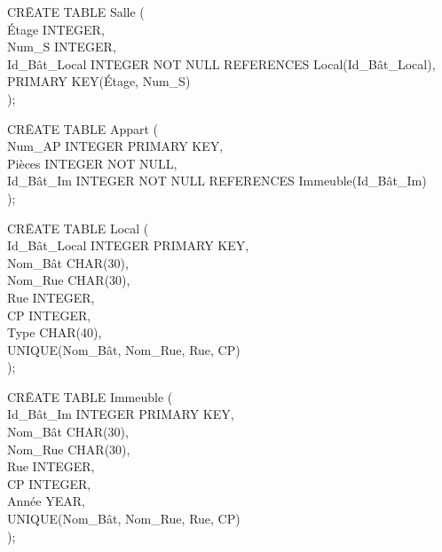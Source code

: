 \documentclass[a4paper,10.5pt]{report}
\begin{document}
		\begin{tabbing}
			CR\=EATE TABLE Salle (\\
			\> Étage INTEGER,\\
			\> Num\_S INTEGER,\\
			\> Id\_Bât\_Local INTEGER NOT NULL REFERENCES Local(Id\_Bât\_Local),\\
			\> PRIMARY KEY(Étage, Num\_S)\\);
		\end{tabbing}

		\begin{tabbing}
			CR\=EATE TABLE Appart (\\
			\> Num\_AP INTEGER PRIMARY KEY,\\
			\> Pièces INTEGER NOT NULL,\\
			\> Id\_Bât\_Im INTEGER NOT NULL REFERENCES Immeuble(Id\_Bât\_Im)\\);
		\end{tabbing}
                                                   
		\begin{tabbing}
			CR\=EATE TABLE Local (\\
			\> Id\_Bât\_Local INTEGER PRIMARY KEY,\\
			\> Nom\_Bât CHAR(30),\\
			\> Nom\_Rue CHAR(30),\\
			\> Rue INTEGER,\\
			\> CP INTEGER,\\
			\> Type CHAR(40),\\
			\> UNIQUE(Nom\_Bât, Nom\_Rue, Rue, CP)\\);
		\end{tabbing}
		\begin{tabbing}
			CR\=EATE TABLE Immeuble (\\
			\> Id\_Bât\_Im INTEGER PRIMARY KEY,\\
			\> Nom\_Bât CHAR(30),\\
			\> Nom\_Rue CHAR(30),\\
			\> Rue INTEGER,\\
			\> CP INTEGER,\\
			\> Année YEAR,\\
			\> UNIQUE(Nom\_Bât, Nom\_Rue, Rue, CP)\\);
		\end{tabbing}
\end{document}
